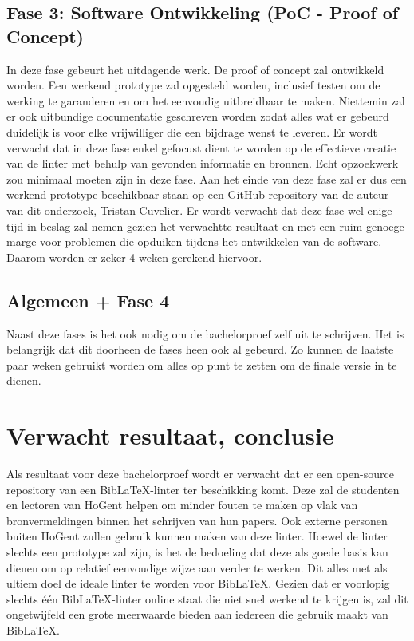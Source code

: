 \subsection{Fase 3: Software Ontwikkeling (PoC - Proof of Concept)}
In deze fase gebeurt het uitdagende werk. De proof of concept zal ontwikkeld worden. Een werkend prototype zal opgesteld worden, inclusief testen om de werking te garanderen en om het eenvoudig uitbreidbaar te maken. Niettemin zal er ook uitbundige documentatie geschreven worden zodat 
alles wat er gebeurd duidelijk is voor elke vrijwilliger die een bijdrage wenst te leveren. Er wordt verwacht dat in deze fase enkel gefocust dient te worden op de effectieve creatie van de linter met behulp van gevonden informatie en bronnen. Echt opzoekwerk zou minimaal moeten zijn in deze fase.
Aan het einde van deze fase zal er dus een werkend prototype beschikbaar staan op een GitHub-repository van de auteur van dit onderzoek, Tristan Cuvelier. 
Er wordt verwacht dat deze fase wel enige tijd in beslag zal nemen gezien het verwachtte resultaat en met een ruim genoege marge voor problemen die opduiken tijdens het ontwikkelen van de software. Daarom worden er zeker 4 weken gerekend hiervoor.

\subsection{Algemeen + Fase 4}
Naast deze fases is het ook nodig om de bachelorproef zelf uit te schrijven. Het is belangrijk dat dit doorheen de fases heen ook al gebeurd. Zo kunnen de laatste paar weken gebruikt worden om alles op punt te zetten om de finale versie in te dienen.

\section{Verwacht resultaat, conclusie}%
\label{sec:verwachte_resultaten}

Als resultaat voor deze bachelorproef wordt er verwacht dat er een open-source repository van een BibLaTeX-linter ter beschikking komt. Deze zal de studenten en lectoren van HoGent helpen om minder fouten te maken op vlak van bronvermeldingen binnen het schrijven van hun papers. Ook externe personen buiten HoGent zullen gebruik kunnen maken van deze linter.
Hoewel de linter slechts een prototype zal zijn, is het de bedoeling dat deze als goede basis kan dienen om op relatief eenvoudige wijze aan verder te werken. Dit alles met als ultiem doel de ideale linter te worden voor BibLaTeX. Gezien dat er voorlopig slechts één BibLaTeX-linter online staat die niet snel werkend te krijgen is, zal dit ongetwijfeld een grote meerwaarde bieden aan iedereen die gebruik maakt van BibLaTeX.

